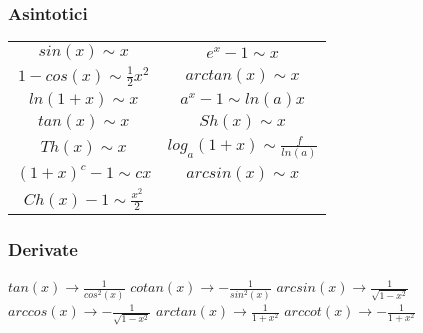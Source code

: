 \documentclass[fontsize=8pt]{scrartcl}
\begin{document}
\begin{multicols*}{4}
\subsubsection*{Asintotici}
\begin{tabular}{ c c }
    $sin(x) \sim x$ & $e^{x} -1 \sim x$\\
    $1-cos(x) \sim \frac{1}{2}x^2$ & $arctan(x) \sim x$ \\
    $ln(1+x) \sim x$ & $a^{x} -1 \sim ln(a) x$\\
    $tan(x) \sim x$ & $Sh(x) \sim x$ \\
    $Th(x) \sim x$ & $log_a (1+x) \sim \frac{f}{ln(a)}$\\
    $(1+x)^c -1 \sim cx$ & $arcsin(x) \sim x$\\
    $Ch(x) -1 \sim  \frac{x^2}{2}$
\end{tabular}
\subsubsection*{Derivate}
$tan(x) \rightarrow \frac{1}{cos^2(x)}$\newline
$cotan(x) \rightarrow  - \frac{1}{sin^2(x)}$\newline
$arcsin(x) \rightarrow  \frac{1}{\sqrt{1-x^2}}$\newline
$arccos(x) \rightarrow - \frac{1}{\sqrt{1-x^2}}$\newline
$arctan(x) \rightarrow  \frac{1}{1+x^2}$\newline
$arccot(x) \rightarrow - \frac{1}{1+x^2}$

\end{multicols*}
\end{document}

